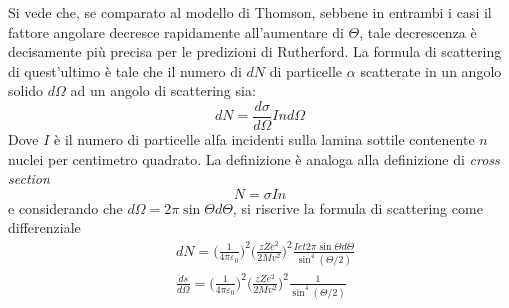 Si vede che, se comparato al modello di Thomson, sebbene in entrambi i casi il fattore angolare decresce rapidamente all'aumentare di $\Theta$, tale decrescenza è decisamente più precisa per le predizioni di Rutherford.
La formula di scattering di quest'ultimo è tale che il numero di $dN$ di particelle $\alpha$ scatterate in un angolo solido $d \Omega$ ad un angolo di scattering sia:
\begin{equation}
dN =  \frac{ d\sigma }{d\Omega} I n d\Omega
\end{equation}
Dove $I$ è il numero di particelle alfa incidenti sulla lamina sottile contenente $n$ nuclei per centimetro quadrato.
La definizione è analoga alla definizione di \textit{cross section}
\begin{equation}
N = \sigma I n
\end{equation}
e considerando che $d\Omega = 2\pi\sin\Theta d\Theta$, si riscrive la formula di scattering come differenziale
\begin{equation}
\begin{split}
& dN =  \biggl( \frac{1}{4\pi \varepsilon_0} \biggr) ^2  \biggl( \frac{z Z e^2}{2 M v^2} \biggr)^2  \frac{ I e t 2 \pi \sin\Theta d\Theta }{ \sin^4(\Theta/2) } \\
& \frac{ds}{d\Omega} = \biggl( \frac{1}{4 \pi \varepsilon_0} \biggr)^2  \biggl( \frac{z Z e^2}{2 M v^2} \biggr)^2  \frac{ 1 }{ \sin^4(\Theta/2) }
\end{split}
\end{equation}





